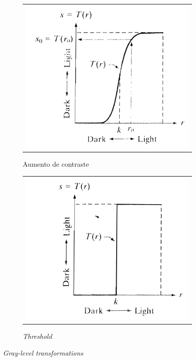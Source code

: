\begin{figure}[!h]
  \begin{subfigure}{.5\textwidth}
    \centering
    \begin{tabular}{c}
      \includegraphics[width=1\textwidth]{images/03/01.png}
    \end{tabular}
    \caption{\label{fig:contrast} Aumento de contraste}
  \end{subfigure}
  \begin{subfigure}{.5\textwidth}
    \centering
    \begin{tabular}{c}
      \includegraphics[width=1\textwidth]{images/03/02.png}
    \end{tabular}
    \caption{\label{fig:thresh} \textit{Threshold}}
  \end{subfigure}
  \caption{\label{fig:gray} \textit{Gray-level transformations}}
\end{figure}



